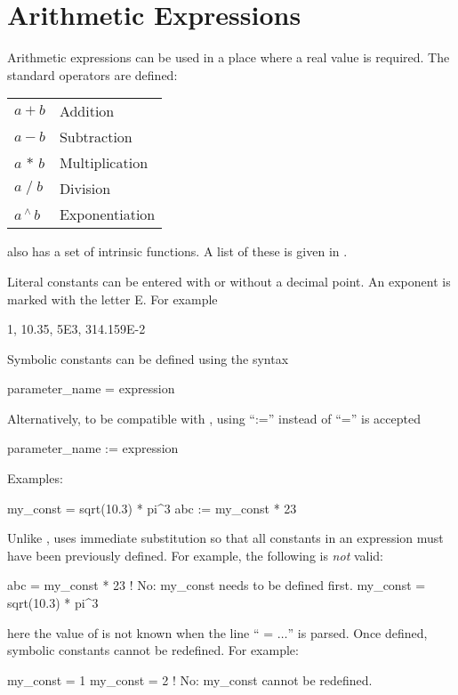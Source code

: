 {{%
\section{Arithmetic Expressions}
\label{s:arith}

Arithmetic expressions can be used in a place where a real value is required.
The standard operators are defined: \hfil\break
\hspace*{0.15in}
\begin{tabular}{ll}
  $a + b$           & Addition        \\
  $a - b$           & Subtraction     \\
  $a \, \ast \, b$  & Multiplication  \\
  $a \; / \; b$     & Division        \\
  $a \, ^{\scriptstyle\wedge} \, b$ & Exponentiation  \\
\end{tabular}
\hfil\break
\bmad also has a set of intrinsic functions. A list of these is given
in .

Literal constants can be entered with or without a decimal point. An
exponent is marked with the letter E. For example
\begin{example}
  1, 10.35, 5E3, 314.159E-2
\end{example}
Symbolic constants can be defined using the syntax
\begin{example}
  parameter_name = expression
\end{example}
Alternatively, to be compatible with \mad, using ``:='' instead of ``='' is accepted
\begin{example}
  parameter_name := expression
\end{example}
Examples:
\begin{example}
  my_const = sqrt(10.3) * pi^3
  abc     := my_const * 23
\end{example}
Unlike \mad, \bmad uses immediate substitution so that all constants
in an expression must have been previously defined. For example, the
following is {\em not} valid:
\begin{example}
  abc      = my_const * 23      ! No: my_const needs to be defined first.
  my_const = sqrt(10.3) * pi^3
\end{example}
here the value of  is not known when the line ``
= $\ldots$'' is parsed. Once
defined, symbolic constants cannot be redefined. For example:
\begin{example}
  my_const = 1
  my_const = 2  ! No: my_const cannot be redefined.
\end{example}

}}
